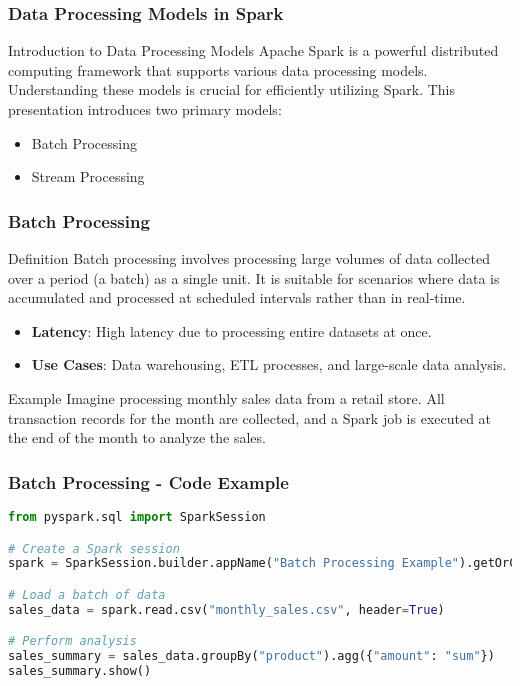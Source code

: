 \documentclass[aspectratio=169]{beamer}
\begin{document}
\begin{frame}
    \frametitle{Data Processing Models in Spark}
    \begin{block}{Introduction to Data Processing Models}
        Apache Spark is a powerful distributed computing framework that supports 
        various data processing models. Understanding these models is crucial 
        for efficiently utilizing Spark. This presentation introduces two primary 
        models: 
        \begin{itemize}
            \item Batch Processing
            \item Stream Processing
        \end{itemize}
    \end{block}
\end{frame}

\begin{frame}
    \frametitle{Batch Processing}
    \begin{block}{Definition}
        Batch processing involves processing large volumes of data collected 
        over a period (a batch) as a single unit. It is suitable for scenarios 
        where data is accumulated and processed at scheduled intervals rather 
        than in real-time.
    \end{block}

    \begin{itemize}
        \item \textbf{Latency}: High latency due to processing entire datasets 
        at once.
        \item \textbf{Use Cases}: Data warehousing, ETL processes, and large-scale 
        data analysis.
    \end{itemize}
    
    \begin{block}{Example}
        Imagine processing monthly sales data from a retail store. All 
        transaction records for the month are collected, and a Spark job 
        is executed at the end of the month to analyze the sales.
    \end{block}
\end{frame}

\begin{frame}[fragile]
    \frametitle{Batch Processing - Code Example}
    \begin{lstlisting}[language=Python,backgroundcolor=\color{lightgray}]
from pyspark.sql import SparkSession

# Create a Spark session
spark = SparkSession.builder.appName("Batch Processing Example").getOrCreate()

# Load a batch of data
sales_data = spark.read.csv("monthly_sales.csv", header=True)

# Perform analysis
sales_summary = sales_data.groupBy("product").agg({"amount": "sum"})
sales_summary.show()
    \end{lstlisting}
\end{frame}
\end{document}
